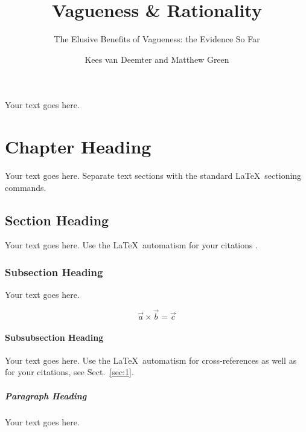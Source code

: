 \documentclass[graybox,envcountchap,sectrefs%
,footinfo
]{svmono}
\begin{document}
\author{Kees van Deemter and Matthew Green}
\title{Vagueness \& Rationality}
\subtitle{The Elusive Benefits of Vagueness: the Evidence So Far}
\maketitle

\frontmatter
\tableofcontents

\mainmatter%

Your text goes here.

\chapter{Chapter Heading}
\label{intro1} %

Your text goes here. Separate text sections with the standard \LaTeX\
sectioning commands.

\section{Section Heading}
\label{sec:1.1}
Your text goes here. Use the \LaTeX\ automatism for your citations
\cite{vanDeemterCMR}.

\subsection{Subsection Heading}
\label{sec:2}
Your text goes here.

\begin{equation}
\vec{a}\times\vec{b}=\vec{c}
\end{equation}

\subsubsection{Subsubsection Heading}
Your text goes here. Use the \LaTeX\ automatism for cross-references as
well as for your citations, see Sect.~\ref{sec:1}.

\paragraph{Paragraph Heading} %
Your text goes here.
\end{document}
